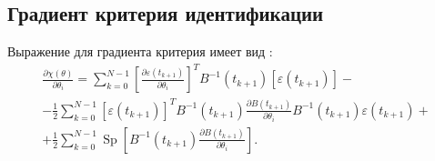 \documentclass[a4paper,14pt]{extarticle}
\DeclareMathOperator{\Sp}{Sp}
\newcommand{\eps}{\varepsilon}
\begin{document}
\subsection{Градиент критерия идентификации}

Выражение для градиента критерия имеет вид \cite{mono}:
\begin{equation*}
\begin{split}
  \frac{\partial \chi(\theta)}{\partial \theta_i} = \sum\limits_{k=0}^{N-1}
  \left[ \frac{\partial \eps(t_{k+1})}{\partial \theta_i} \right]^T
  B^{-1}(t_{k+1}) \left[ \eps(t_{k+1}) \right] - \\
  - \frac{1}{2}
  \sum\limits_{k=0}^{N-1} \left[ \eps(t_{k+1}) \right]^T B^{-1}(t_{k+1})
  \frac{\partial B(t_{k+1})}{\partial \theta_i} B^{-1}(t_{k+1}) \eps(t_{k+1}) +
  \\ + 
  \frac{1}{2} \sum\limits_{k=0}^{N-1} \Sp \left[ B^{-1}(t_{k+1})
  \frac{\partial B(t_{k+1})}{\partial \theta_i} \right]. 
\end{split}
\end{equation*}
\end{document}
